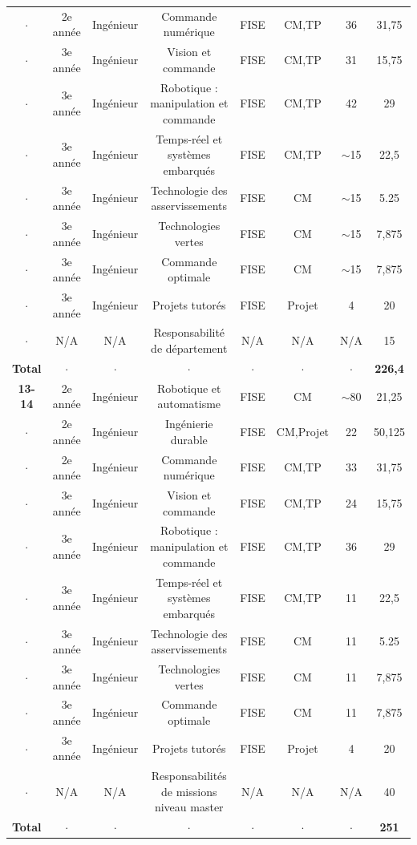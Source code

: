 \documentclass[a4paper,12pt]{article}
\begin{document}
{\begin{tabular}{cccccccc}
  $\cdot$ & 2e année  & Ingénieur & Commande numérique  & FISE & CM,TP & 36  & 31,75  \\
  $\cdot$ & 3e année  & Ingénieur & Vision et commande & FISE & CM,TP & 31 & 15,75  \\
  $\cdot$ & 3e année  & Ingénieur & Robotique : manipulation et commande & FISE & CM,TP & 42 & 29  \\
  $\cdot$ & 3e année  & Ingénieur & Temps-réel et systèmes embarqués & FISE & CM,TP & \(\sim \)15 & 22,5  \\
  $\cdot$ & 3e année  & Ingénieur & Technologie des asservissements & FISE & CM & \(\sim \)15 & 5.25  \\
  $\cdot$ & 3e année  & Ingénieur & Technologies vertes & FISE & CM & \(\sim \)15 & 7,875  \\
  $\cdot$ & 3e année  & Ingénieur & Commande optimale & FISE & CM & \(\sim \)15 & 7,875  \\
  $\cdot$ & 3e année  & Ingénieur & Projets tutorés & FISE & Projet & 4 & 20  \\
  $\cdot$ & N/A       & N/A       & Responsabilité de département & N/A & N/A & N/A & 15  \\
 \bf{Total} & $\cdot$ & $\cdot$ & $\cdot$ & $\cdot$ & $\cdot$ & $\cdot$ &  {\bf 226,4} \\\midrule
  \bf{13-14} & 2e année  & Ingénieur & Robotique et automatisme & FISE & CM & \(\sim \)80 & 21,25 \\
 $\cdot$ & 2e année  & Ingénieur & Ingénierie durable  & FISE & CM,Projet & 22  & 50,125  \\
  $\cdot$ & 2e année  & Ingénieur & Commande numérique  & FISE & CM,TP & 33  & 31,75  \\
  $\cdot$ & 3e année  & Ingénieur & Vision et commande & FISE & CM,TP & 24 & 15,75  \\
  $\cdot$ & 3e année  & Ingénieur & Robotique : manipulation et commande & FISE & CM,TP & 36 & 29  \\
  $\cdot$ & 3e année  & Ingénieur & Temps-réel et systèmes embarqués & FISE & CM,TP & 11 & 22,5  \\
  $\cdot$ & 3e année  & Ingénieur & Technologie des asservissements & FISE & CM & 11 & 5.25  \\
  $\cdot$ & 3e année  & Ingénieur & Technologies vertes & FISE & CM & 11 & 7,875  \\
  $\cdot$ & 3e année  & Ingénieur & Commande optimale & FISE & CM & 11 & 7,875  \\
  $\cdot$ & 3e année  & Ingénieur & Projets tutorés & FISE & Projet & 4 & 20  \\
  $\cdot$ & N/A       & N/A       & Responsabilités de missions niveau master & N/A & N/A & N/A & 40  \\
  \bf{Total} & $\cdot$ & $\cdot$ & $\cdot$ & $\cdot$ & $\cdot$ & $\cdot$ &  {\bf 251} \\ \bottomrule
\end{tabular}

}
\end{document}
